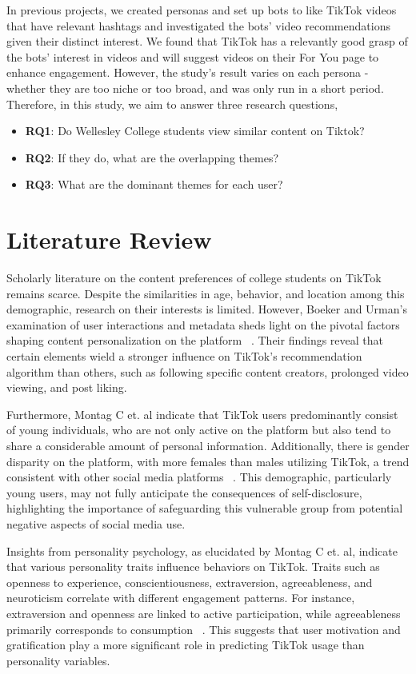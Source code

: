 \documentclass[acmtog]{acmart}
\begin{document}
In previous projects, we created personas and set up bots to like TikTok videos that have relevant hashtags and investigated the bots' video recommendations given their distinct interest. We found that TikTok has a relevantly good grasp of the bots’ interest in videos and will suggest videos on their For You page to enhance engagement. However, the study’s result varies on each persona - whether they are too niche or too broad, and was only run in a short period. Therefore, in this study, we aim to answer three research questions, 

\begin{itemize}
    \item \textbf{RQ1}: Do Wellesley College students view similar content on Tiktok? 
    \item \textbf{RQ2}: If they do, what are the overlapping themes? 
    \item \textbf{RQ3}: What are the dominant themes for each user?  
\end{itemize}

\section{Literature Review}
Scholarly literature on the content preferences of college students on TikTok remains scarce. Despite the similarities in age, behavior, and location among this demographic, research on their interests is limited. However, Boeker and Urman's examination of user interactions and metadata sheds light on the pivotal factors shaping content personalization on the platform ~\cite{boeker2022empirical}. Their findings reveal that certain elements wield a stronger influence on TikTok's recommendation algorithm than others, such as following specific content creators, prolonged video viewing, and post liking.

Furthermore, Montag C et. al indicate that TikTok users predominantly consist of young individuals, who are not only active on the platform but also tend to share a considerable amount of personal information. Additionally, there is gender disparity on the platform, with more females than males utilizing TikTok, a trend consistent with other social media platforms ~\cite{montag2021psychology}.
This demographic, particularly young users, may not fully anticipate the consequences of self-disclosure, highlighting the importance of safeguarding this vulnerable group from potential negative aspects of social media use.

Insights from personality psychology, as elucidated by Montag C et. al, indicate that various personality traits influence behaviors on TikTok. Traits such as openness to experience, conscientiousness, extraversion, agreeableness, and neuroticism correlate with different engagement patterns. For instance, extraversion and openness are linked to active participation, while agreeableness primarily corresponds to consumption ~\cite{montag2021psychology}. This suggests that user motivation and gratification play a more significant role in predicting TikTok usage than personality variables.
\end{document}
